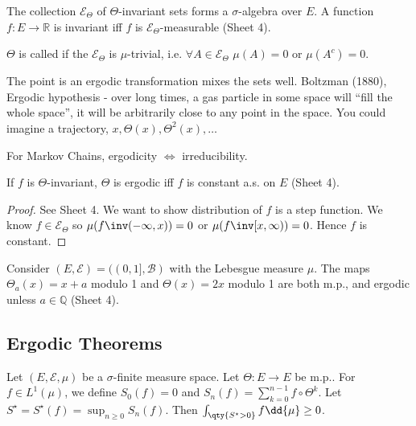 The collection $\mathcal E_\Theta$ of $\Theta$-invariant sets forms a $\sigma$-algebra over $E$.
A function $f \colon E \to \mathbb R$ is invariant iff $f$ is $\mathcal E_\Theta$-measurable (Sheet 4).

\begin{definition}[Ergodic]
	$\Theta$ is called  if the $\mathcal{E}_\Theta$ is $\mu$-trivial, i.e. $\forall A \in \mathcal{E}_\Theta$ $\mu(A) = 0$ or $\mu(A^c) = 0$.
\end{definition}

The point is an ergodic transformation mixes the sets well.
Boltzman (1880), Ergodic hypothesis - over long times, a gas particle in some space will ``fill the whole space'', it will be arbitrarily close to any point in the space.
You could imagine a trajectory, $x, \Theta(x), \Theta^2(x), \dots$


For Markov Chains, ergodicity $\iff$ irreducibility.

\begin{fact}
	If $f$ is $\Theta$-invariant, $\Theta$ is ergodic iff $f$ is constant a.s. on $E$ (Sheet 4).
\end{fact}

\begin{proof}
	See Sheet 4.
	We want to show distribution of $f$ is a step function.
	We know $f \in \mathcal{E}_\Theta$ so $\mu(f\inv(-\infty, x)) = 0$ or $\mu(f\inv[x, \infty)) = 0$.
	Hence $f$ is constant. %
\end{proof}

\begin{example}
	Consider $(E, \mathcal E) = ((0,1], \mathcal B)$ with the Lebesgue measure $\mu$.
	The maps $\Theta_a(x) = x + a$ modulo 1 and $\Theta(x) = 2x$ modulo 1 are both m.p., and ergodic unless $a \in \mathbb Q$ (Sheet 4).
\end{example}

\subsection{Ergodic Theorems}
\begin{lemma} \label{lem:max}
    Let $(E, \mathcal E, \mu)$ be a $\sigma$-finite measure space.
	Let $\Theta \colon E \to E$ be m.p..
	For $f \in L^1(\mu)$, we define $S_0(f) = 0$ and $S_n(f) = \sum_{k=0}^{n-1} f \circ \Theta^k$.
    Let $S^\star = S^\star(f) = \sup_{n \geq 0} S_n(f)$.
    Then $\int_{\qty{S^\star > 0}} f \dd{\mu} \geq 0$.
\end{lemma}

